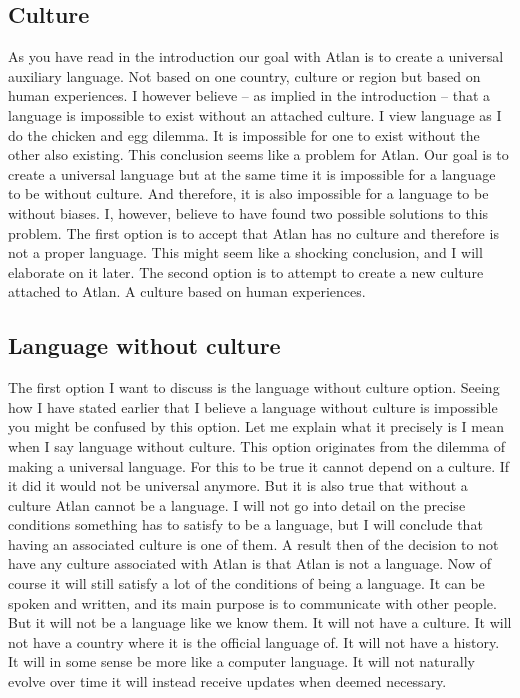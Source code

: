 \subsection{Culture}

\noindent As you have read in the introduction our goal with Atlan is to create a universal auxiliary language. Not based on one country, culture or region but based on human experiences. I however believe – as implied in the introduction – that a language is impossible to exist without an attached culture. I view language as I do the chicken and egg dilemma. It is impossible for one to exist without the other also existing. This conclusion seems like a problem for Atlan. Our goal is to create a universal language but at the same time it is impossible for a language to be without culture. And therefore, it is also impossible for a language to be without biases. I, however, believe to have found two possible solutions to this problem. The first option is to accept that Atlan has no culture and therefore is not a proper language. This might seem like a shocking conclusion, and I will elaborate on it later. The second option is to attempt to create a new culture attached to Atlan. A culture based on human experiences.  

\subsection{Language without culture} 

\noindent The first option I want to discuss is the language without culture option. Seeing how I have stated earlier that I believe a language without culture is impossible you might be confused by this option. Let me explain what it precisely is I mean when I say language without culture. This option originates from the dilemma of making a universal language. For this to be true it cannot depend on a culture. If it did it would not be universal anymore. But it is also true that without a culture Atlan cannot be a language. I will not go into detail on the precise conditions something has to satisfy to be a language, but I will conclude that having an associated culture is one of them. A result then of the decision to not have any culture associated with Atlan is that Atlan is not a language. Now of course it will still satisfy a lot of the conditions of being a language. It can be spoken and written, and its main purpose is to communicate with other people. But it will not be a language like we know them. It will not have a culture. It will not have a country where it is the official language of. It will not have a history. It will in some sense be more like a computer language. It will not naturally evolve over time it will instead receive updates when deemed necessary.  

